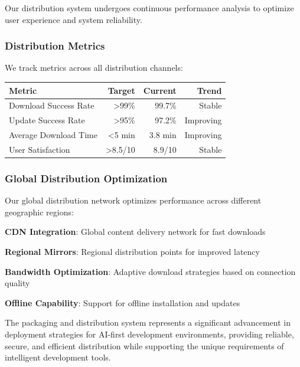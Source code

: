 Our distribution system undergoes continuous performance analysis to optimize user experience and system reliability.

\subsubsection*{Distribution Metrics}

We track metrics across all distribution channels:

\begin{center}
\begin{tabular}{@{}lrrr@{}}
\toprule
\textbf{Metric} & \textbf{Target} & \textbf{Current} & \textbf{Trend} \\
\midrule
Download Success Rate & >99\% & 99.7\% & Stable \\
Update Success Rate & >95\% & 97.2\% & Improving \\
Average Download Time & <5 min & 3.8 min & Improving \\
User Satisfaction & >8.5/10 & 8.9/10 & Stable \\
\bottomrule
\end{tabular}
\end{center}

\subsubsection*{Global Distribution Optimization}

Our global distribution network optimizes performance across different geographic regions:

\begin{expandedlist}
    \item \textbf{CDN Integration}: Global content delivery network for fast downloads
    \item \textbf{Regional Mirrors}: Regional distribution points for improved latency
    \item \textbf{Bandwidth Optimization}: Adaptive download strategies based on connection quality
    \item \textbf{Offline Capability}: Support for offline installation and updates
\end{expandedlist}

The packaging and distribution system represents a significant advancement in deployment strategies for AI-first development environments, providing reliable, secure, and efficient distribution while supporting the unique requirements of intelligent development tools.
